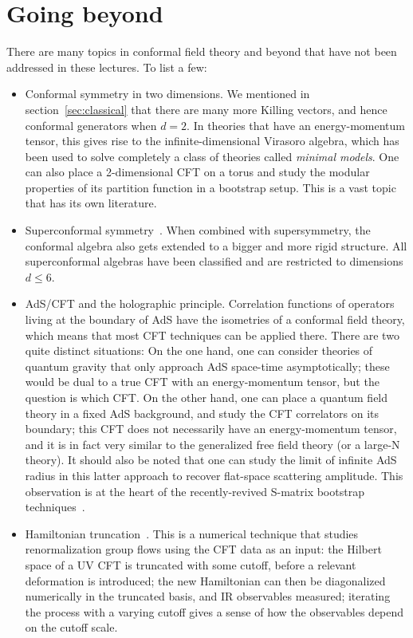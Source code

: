 \documentclass[a4paper,12pt]{article}
\numberwithin{equation}{section}
\begin{document}

\section{Going beyond}

There are many topics in conformal field theory and beyond that have not been addressed in these lectures. To list a few:
\begin{itemize}

\item
Conformal symmetry in two dimensions. 
We mentioned in section~\ref{sec:classical} that there are many more Killing vectors, and hence conformal generators when $d = 2$. In theories that have an energy-momentum tensor, this gives rise to the infinite-dimensional Virasoro algebra, which has been used to solve completely a class of theories called \emph{minimal models}. 
One can also place a 2-dimensional CFT on a torus and study the modular properties of its partition function in a bootstrap setup. This is a vast topic that has its own literature.

\item
Superconformal symmetry~\cite{Argyres:2022mnu}. When combined with supersymmetry, the conformal algebra also gets extended to a bigger and more rigid structure. All superconformal algebras have been classified and are restricted to dimensions $d \leq 6$. 

\item
AdS/CFT and the holographic principle.
Correlation functions of operators living at the boundary of AdS have the isometries of a conformal field theory, which means that most CFT techniques can be applied there. There are two quite distinct situations: On the one hand, one can consider theories of quantum gravity that only approach AdS space-time asymptotically; these would be dual to a true CFT with an energy-momentum tensor, but the question is which CFT. 
On the other hand, one can place a quantum field theory in a fixed AdS background, and study the CFT correlators on its boundary; this CFT does not necessarily have an energy-momentum tensor, and it is in fact very similar to the generalized free field theory (or a large-N theory).
It should also be noted that one can study the limit of infinite AdS radius in this latter approach to recover flat-space scattering amplitude. This observation is at the heart of the recently-revived S-matrix bootstrap techniques~\cite{Kruczenski:2022lot}.

\item
Hamiltonian truncation~\cite{Fitzpatrick:2022dwq}.
This is a numerical technique that studies renormalization group flows using the CFT data as an input: the Hilbert space of a UV CFT is truncated with some cutoff, before a relevant deformation is introduced; the new Hamiltonian can then be diagonalized numerically in the truncated basis, and IR observables measured; iterating the process with a varying cutoff gives a sense of how the observables depend on the cutoff scale. 
 
\end{itemize}
\end{document}

